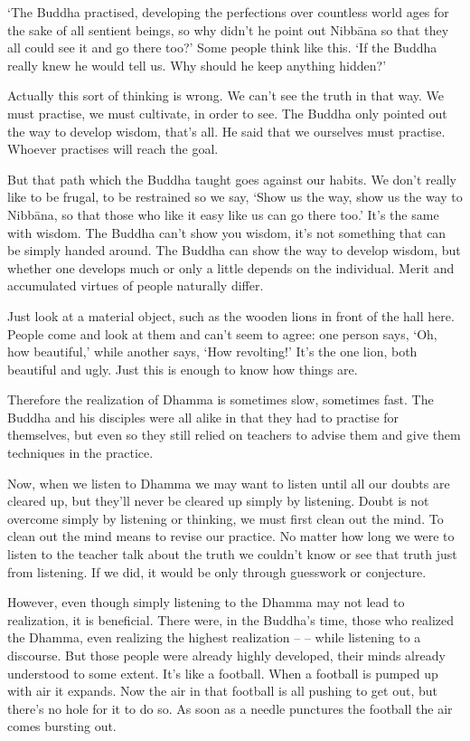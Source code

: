 `The Buddha practised, developing the perfections over countless world ages for the sake of all sentient beings, so why didn't he point out Nibb\=ana so that they all could see it and go there too?' Some people think like this. `If the Buddha really knew he would tell us. Why should he keep anything hidden?'

Actually this sort of thinking is wrong. We can't see the truth in that way. We must practise, we must cultivate, in order to see. The Buddha only pointed out the way to develop wisdom, that's all. He said that we ourselves must practise. Whoever practises will reach the goal.

But that path which the Buddha taught goes against our habits. We don't really like to be frugal, to be restrained so we say, `Show us the way, show us the way to Nibb\=ana, so that those who like it easy like us can go there too.' It's the same with wisdom. The Buddha can't show you wisdom, it's not something that can be simply handed around. The Buddha can show the way to develop wisdom, but whether one develops much or only a little depends on the individual. Merit and accumulated virtues of people naturally differ.

Just look at a material object, such as the wooden lions in front of the hall here. People come and look at them and can't seem to agree: one person says, `Oh, how beautiful,' while another says, `How revolting!' It's the one lion, both beautiful and ugly. Just this is enough to know how things are.

Therefore the realization of Dhamma is sometimes slow, sometimes fast. The Buddha and his disciples were all alike in that they had to practise for themselves, but even so they still relied on teachers to advise them and give them techniques in the practice.

Now, when we listen to Dhamma we may want to listen until all our doubts are cleared up, but they'll never be cleared up simply by listening. Doubt is not overcome simply by listening or thinking, we must first clean out the mind. To clean out the mind means to revise our practice. No matter how long we were to listen to the teacher talk about the truth we couldn't know or see that truth just from listening. If we did, it would be only through guesswork or conjecture.

However, even though simply listening to the Dhamma may not lead to realization, it is beneficial. There were, in the Buddha's time, those who realized the Dhamma, even realizing the highest realization --  -- while listening to a discourse. But those people were already highly developed, their minds already understood to some extent. It's like a football. When a football is pumped up with air it expands. Now the air in that football is all pushing to get out, but there's no hole for it to do so. As soon as a needle punctures the football the air comes bursting out.

